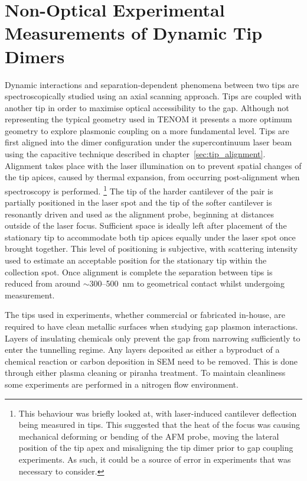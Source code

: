 \documentclass[a4paper]{article}
\begin{document}
\section{Non-Optical Experimental Measurements of Dynamic Tip Dimers}

Dynamic interactions and separation-dependent phenomena between two tips are spectroscopically studied using an axial scanning approach. Tips are coupled with another tip in order to maximise optical accessibility to the gap. Although not representing the typical geometry used in TENOM it presents a more optimum geometry to explore plasmonic coupling on a more fundamental level.
Tips are first aligned into the dimer configuration under the supercontinuum laser beam using the capacitive technique described in chapter~\ref{sec:tip_alignment}. Alignment takes place with the laser illumination on to prevent spatial changes of the tip apices, caused by thermal expansion, from occurring post-alignment when spectroscopy is performed.%
\footnote{This behaviour was briefly looked at, with laser-induced cantilever deflection being measured in tips. This suggested that the heat of the focus was causing mechanical deforming or bending of the AFM probe, moving the lateral position of the tip apex and misaligning the tip dimer prior to gap coupling experiments. As such, it could be a source of error in experiments that was necessary to consider.}
The tip of the harder cantilever of the pair is partially positioned in the laser spot and the tip of the softer cantilever is resonantly driven and used as the alignment probe, beginning at distances outside of the laser focus. Sufficient space is ideally left after placement of the stationary tip to accommodate both tip apices equally under the laser spot once brought together. This level of positioning is subjective, with scattering intensity used to estimate an acceptable position for the stationary tip within the collection spot. Once alignment is complete the separation between tips is reduced from around $\sim$300--\SI{500}{nm} to geometrical contact whilst undergoing measurement.

The tips used in experiments, whether commercial or fabricated in-house, are required to have clean metallic surfaces when studying gap plasmon interactions. Layers of insulating chemicals only prevent the gap from narrowing sufficiently to enter the tunnelling regime. Any layers deposited as either a byproduct of a chemical reaction or carbon deposition in SEM need to be removed. This is done through either plasma cleaning or piranha treatment. To maintain cleanliness some experiments are performed in a nitrogen flow environment.
\end{document}
